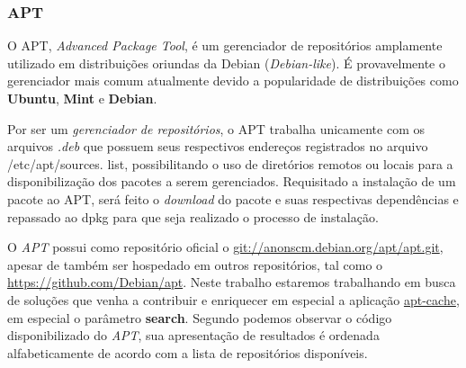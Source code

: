 \subsubsection{APT} %
\label{subs:apt}

O {\code APT}, \textit{Advanced Package Tool}, é um gerenciador de repositórios  amplamente utilizado em distribuições oriundas da Debian (\textit{Debian-like}).
É provavelmente o gerenciador mais comum atualmente devido a popularidade de distribuições como \textbf{Ubuntu}, \textbf{Mint} e \textbf{Debian}.

Por ser um \textit{gerenciador de repositórios}, o {\code APT} trabalha unicamente com os arquivos \textit{.deb} que possuem seus respectivos endereços registrados no arquivo {\code/etc/apt/sources. list}, possibilitando o uso de diretórios remotos ou locais para a disponibilização dos pacotes a serem gerenciados. Requisitado a instalação de um pacote ao {\code APT}, será feito o \textit{download} do pacote e  suas respectivas dependências e repassado ao {\code dpkg} para que seja realizado o processo de instalação.

O \textit{APT} possui como repositório oficial o \url{git://anonscm.debian.org/apt/apt.git}, apesar de também ser hospedado em outros repositórios, tal como o \url{https://github.com/Debian/apt}. Neste trabalho estaremos trabalhando em busca de soluções que venha a contribuir e enriquecer em especial a aplicação \href{https://github.com/Debian/apt/blob/debian/experimental/cmdline/apt-cache.cc}{apt-cache}, em especial o parâmetro \textbf{search}. Segundo podemos observar o código disponibilizado do \textit{APT}, sua apresentação de resultados é ordenada alfabeticamente de acordo com a lista de repositórios disponíveis.




